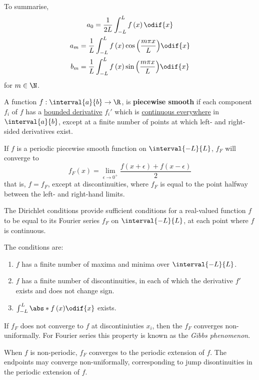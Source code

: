 \documentclass{article}
\begin{document}
To summarise,
\begin{gather*}
    a_0 = \frac{1}{2L} \int_{-L}^L f\left( x \right) \odif{x} \\
    a_m = \frac{1}{L} \int_{-L}^L f\left( x \right) \cos{\left( \frac{m \pi x}{L} \right)} \odif{x} \\
    b_m = \frac{1}{L} \int_{-L}^L f\left( x \right) \sin{\left( \frac{m \pi x}{L} \right)} \odif{x}
\end{gather*}
for \(m \in \N\).
\begin{definition}
    A function \(f : \interval{a}{b} \to \R\), is \textbf{piecewise smooth} if each component \(f_i\) of \(f\) has a \underline{bounded derivative} \(f_i'\) which is \underline{continuous everywhere} in \(\interval{a}{b}\), except at
    a finite number of points at which left- and right-sided derivatives exist.
\end{definition}
\begin{theorem}
    If \(f\) is a periodic piecewise smooth function on \(\interval{-L}{L}\), \(f_F\) will converge to
    \begin{equation*}
        f_F\left( x \right) = \lim_{\epsilon \to 0^{+}} \frac{f\left( x + \epsilon \right) + f\left( x - \epsilon \right)}{2}
    \end{equation*}
    that is, \(f = f_F\), except at discontinuities, where \(f_F\) is equal to the point halfway between the left- and right-hand limits.
\end{theorem}
\begin{corollary}
    The Dirichlet conditions provide sufficient conditions for a real-valued function \(f\) to be
    equal to its Fourier series \(f_F\) on \(\interval{-L}{L}\), at each point where \(f\) is continuous.

    The conditions are:
    \begin{enumerate}
        \item \(f\) has a finite number of maxima and minima over \(\interval{-L}{L}\).
        \item \(f\) has a finite number of discontinuities, in each of which the derivative \(f'\) exists
              and does not change sign.
        \item \(\int_{-L}^L \abs*{f\left( x \right)} \odif{x}\) exists.
    \end{enumerate}
\end{corollary}
\begin{definition}
    If \(f_F\) does not converge to \(f\) at discontiniuties \(x_i\), then the \(f_F\) converges
    non-uniformally. For Fourier series this property is known as the \textit{Gibbs phenomenon}.
\end{definition}
\begin{note}
    When \(f\) is non-periodic, \(f_F\) converges to the periodic extension of \(f\).
    The endpoints may converge non-uniformally, corresponding to jump disontinuities in the periodic extension of \(f\).
\end{note}
\end{document}
